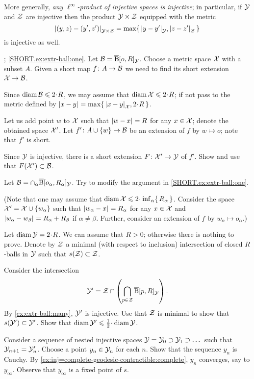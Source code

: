More generally, \textit{any $\ell^\infty$-product of injective spaces is injective};
in particular, if $\mathcal{Y}$ and $\mathcal{Z}$ are injective then the product $\mathcal{Y}\times\mathcal{Z}$ equipped with the metric 
\[\dist{(y,z)}{(y',z')}{\spc{Y}\times\spc{Z}}=\max\{\,\dist{y}{y'}{\spc{Y}},\dist{z}{z'}{\spc{Z}}\,\}\]
is injective as well.

\parbf{\ref{ex:extr-ball}}; \ref{SHORT.ex:extr-ball:one}.
Let $\mathcal{B}=\overline{\mathrm{B}}{}[o,R]_{\mathcal{Y}}$.
Choose a metric space $\mathcal{X}$ with a subset $A$.
Given a short map $f\colon A\to \mathcal{B}$ we need to find its short extension $\mathcal{X}\to \mathcal{B}$.

Since $\diam\spc{B}\le 2\cdot R$, we may assume that  $\diam \spc{X}\le 2\cdot R$;
if not pass to the metric defined by $\dist{x}{y}{}=\max\{\,\dist{x}{y}{\spc{X}},2\cdot R\,\}$.

Let us add point $w$ to $\mathcal{X}$ such that $\dist{w}{x}{}=R$ for any $x\in\mathcal{X}$;
denote the obtained space $\mathcal{X}'$.
Let $f'\colon A\cup\{w\}\to \mathcal{B}$ be an extension of $f$ by $w\mapsto o$; note that $f'$ is short.

Since $\mathcal{Y}$ is injective, there is a short extension $F\colon\mathcal{X}'\to \mathcal{Y}$ of $f'$.
Show and use that $F(\mathcal{X}')\subset \mathcal{B}$.

Let $\mathcal{B}=\cap_\alpha\overline{\mathrm{B}}{}[o_\alpha,R_\alpha]_{\mathcal{Y}}$.
Try to modify the argument in \ref{SHORT.ex:extr-ball:one}.

(Note that one may assume that $\diam \spc{X}\z\le 2\cdot \inf_\alpha\{\,R_\alpha\,\}$.
Consider the space $\spc{X}'\z=\spc{X}\cup\{w_\alpha\}$ such that $\dist{w_\alpha}{x}{}=R_\alpha$ for any $x\in \mathcal{X}$ and $\dist{w_\alpha}{w_\beta}{}=R_\alpha+R_\beta$ if $\alpha\ne\beta$.
Further, consider an extension of $f$ by $w_\alpha\mapsto o_\alpha$.)

Let $\diam \spc{Y}=2\cdot R$.
We can assume that $R>0$; otherwise there is nothing to prove.
Denote by $\mathcal{Z}$ a minimal (with respect to inclusion) intersection of closed $R$-balls in $\mathcal{Y}$ such that $s(\mathcal{Z})\subset\mathcal{Z}$.

Consider 
the intersection 
\[\mathcal{Y}'=\mathcal{Z}\cap\left(\bigcap_{p\in \mathcal{Z}} \overline{\mathrm{B}}{}[p,R]_{\mathcal{Y}}\right).\]
By \ref{ex:extr-ball:many}, $\mathcal{Y}'$ is injective.
Use that $\mathcal{Z}$ is minimal to show that $s(\mathcal{Y}')\subset \mathcal{Y}'$.
Show that $\diam \spc{Y}'\le \tfrac12\cdot\diam \spc{Y}$.

Consider a sequence of nested injective spaces $\mathcal{Y}=\mathcal{Y}_0\supset \mathcal{Y}_1\supset\dots$ such that $\spc{Y}_{n+1}\z=\spc{Y}_{n}'$.
Choose a point $y_n\in \mathcal{Y}_{n}$ for each $n$.
Show that the sequence $y_n$ is Cauchy.
By \ref{ex:inj=complete-geodesic-contractible:complete}, $y_n$ converges, say to $y_\infty$.
Observe that $y_\infty$ is a fixed point of $s$.

